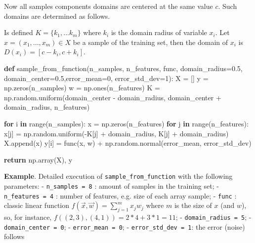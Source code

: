 \documentclass[11pt]{article}
\newenvironment{Shaded}{}{}
\newcommand{\KeywordTok}[1]{\textcolor[rgb]{0.00,0.44,0.13}{\textbf{{#1}}}}
\newcommand{\DecValTok}[1]{\textcolor[rgb]{0.25,0.63,0.44}{{#1}}}
\newcommand{\FloatTok}[1]{\textcolor[rgb]{0.25,0.63,0.44}{{#1}}}
\newcommand{\NormalTok}[1]{{#1}}
\newcommand{\ControlFlowTok}[1]{\textcolor[rgb]{0.00,0.44,0.13}{\textbf{{#1}}}}
\newcommand{\OperatorTok}[1]{\textcolor[rgb]{0.40,0.40,0.40}{{#1}}}
\newcommand{\BuiltInTok}[1]{{#1}}
\begin{document}
Now all samples components domains are centered at the same value \(c\).
Such domains are determined as follows.

Is defined \(K = \{k_1,...k_m\}\) where \(k_i\) is the domain radius of
variable \(x_i\). Let \(x=(x_1,...,x_m) \in X\) be a sample of the
training set, then the domain of \(x_i\) is \(D(x_i) = [c-k_i, c+k_i]\).

\begin{Shaded}
\begin{Highlighting}[]
\KeywordTok{def}\NormalTok{ sample_from_function(n_samples, n_features, func, domain_radius}\OperatorTok{=}\FloatTok{0.5}\NormalTok{, domain_center}\OperatorTok{=}\FloatTok{0.5}\NormalTok{,error_mean}\OperatorTok{=}\DecValTok{0}\NormalTok{, error_std_dev}\OperatorTok{=}\DecValTok{1}\NormalTok{):}
\NormalTok{    X }\OperatorTok{=}\NormalTok{ []}
\NormalTok{    y }\OperatorTok{=}\NormalTok{ np.zeros(n_samples)}
\NormalTok{    w }\OperatorTok{=}\NormalTok{ np.ones(n_features)}
\NormalTok{    K }\OperatorTok{=}\NormalTok{ np.random.uniform(domain_center }\OperatorTok{-}\NormalTok{ domain_radius, domain_center }\OperatorTok{+}\NormalTok{ domain_radius, n_features)}

    \ControlFlowTok{for}\NormalTok{ i }\KeywordTok{in} \BuiltInTok{range}\NormalTok{(n_samples):}
\NormalTok{        x }\OperatorTok{=}\NormalTok{ np.zeros(n_features)}
        \ControlFlowTok{for}\NormalTok{ j }\KeywordTok{in} \BuiltInTok{range}\NormalTok{(n_features):}
\NormalTok{            x[j] }\OperatorTok{=}\NormalTok{ np.random.uniform(}\OperatorTok{-}\NormalTok{K[j] }\OperatorTok{+}\NormalTok{ domain_radius, K[j] }\OperatorTok{+}\NormalTok{ domain_radius)}
\NormalTok{        X.append(x)}
\NormalTok{        y[i] }\OperatorTok{=}\NormalTok{ func(x, w) }\OperatorTok{+}\NormalTok{ np.random.normal(error_mean, error_std_dev)}

\ControlFlowTok{return}\NormalTok{ np.array(X), y}
\end{Highlighting}
\end{Shaded}

    \textbf{Example}. Detailed execution of \texttt{sample\_from\_function}
with the following parameters: - \texttt{n\_samples\ =\ 8} : amount of
samples in the training set; - \texttt{n\_features\ =\ 4} : number of
features, e.g. size of each array sample; - \texttt{func} : classic
linear function \(f(\vec{x},\vec{w})=\sum_{j=1}^{m} x_j w_j\) where
\(m\) is the size of \(x\) (and \(w\)), so, for instance,
\(f((2,3),(4,1))=2*4+3*1=11\); - \texttt{domain\_radius\ =\ 5}; -
\texttt{domain\_center\ =\ 0}; - \texttt{error\_mean\ =\ 0}; -
\texttt{error\_std\_dev\ =\ 1}: the error (noise) follows
\end{document}
